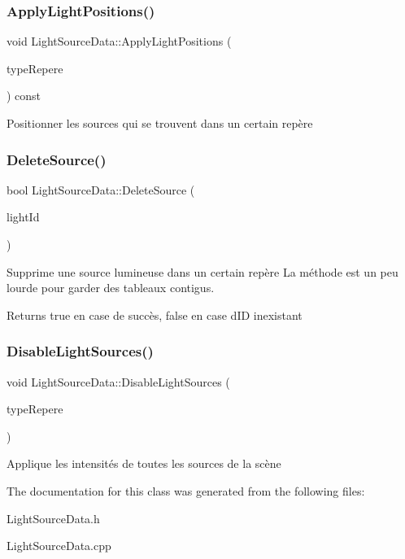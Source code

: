 \subsubsection{\texorpdfstring{ApplyLightPositions()}{ApplyLightPositions()}}
{\footnotesize\ttfamily void Light\+Source\+Data\+::\+Apply\+Light\+Positions (\begin{DoxyParamCaption}\item[{\mbox{\hyperlink{classLightSourceData_abdbcb37900b8147487551a3afcdd90f5}{Light\+Source\+Data\+::\+Type\+Repere}}}]{type\+Repere }\end{DoxyParamCaption}) const}

Positionner les sources qui se trouvent dans un certain repère \mbox{\label{classLightSourceData_a586f688bed495b5e65c44a7abb3a4aa5}} 
\subsubsection{\texorpdfstring{DeleteSource()}{DeleteSource()}}
{\footnotesize\ttfamily bool Light\+Source\+Data\+::\+Delete\+Source (\begin{DoxyParamCaption}\item[{int}]{light\+Id }\end{DoxyParamCaption})}

Supprime une source lumineuse dans un certain repère La méthode est un peu lourde pour garder des tableaux contigus. \begin{DoxyReturn}{Returns}
true en case de succès, false en case d\textquotesingle{}ID inexistant 
\end{DoxyReturn}
\mbox{\label{classLightSourceData_a2601aa99b5f29d10f9e89afb5a4cd300}} 
\subsubsection{\texorpdfstring{DisableLightSources()}{DisableLightSources()}}
{\footnotesize\ttfamily void Light\+Source\+Data\+::\+Disable\+Light\+Sources (\begin{DoxyParamCaption}\item[{\mbox{\hyperlink{classLightSourceData_abdbcb37900b8147487551a3afcdd90f5}{Light\+Source\+Data\+::\+Type\+Repere}}}]{type\+Repere }\end{DoxyParamCaption})}

Applique les intensités de toutes les sources de la scène 

The documentation for this class was generated from the following files\+:\begin{DoxyCompactItemize}
\item 
Light\+Source\+Data.\+h\item 
Light\+Source\+Data.\+cpp\end{DoxyCompactItemize}
